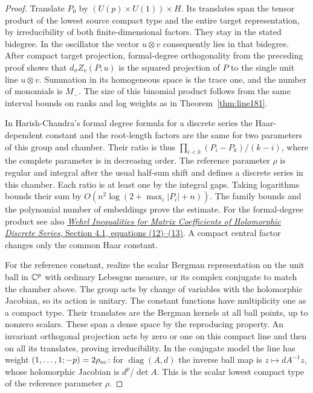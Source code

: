 \documentclass[a4paper,11pt]{article}
\theoremstyle{definition}
\theoremstyle{remark}
\numberwithin{equation}{section}
\begin{document}
\begin{proof}
Translate \(P_0\) by \((U(p)\times U(1))\times H\). Its
translates span the tensor product of the lowest source
compact type and the entire target representation, by
irreducibility of both finite-dimensional factors. They stay
in the stated bidegree. In the oscillator the vector
\(u\otimes v\) consequently lies in that bidegree. After
compact target projection, formal-degree orthogonality from
the preceding proof shows that \(d_\sigma Z_v(P;u)\) is
the squared projection of \(P\) to the single unit line
\(u\otimes v\). Summation in its homogeneous space is the
trace one, and the number of monomials is \(M_-\).
The size of this binomial product follows from the same
interval bounds on ranks and log weights as in
Theorem~\ref{thm:line181}.

In Harish-Chandra's formal degree formula for a discrete series
the Haar-dependent constant and the root-length factors are
the same for two parameters of this group and chamber. Their
ratio is thus \(\prod_{i<k}(P_i-P_k)/(k-i)\), where the
complete parameter is in decreasing order. The reference
parameter \(\rho\) is regular and integral after the usual
half-sum shift and defines a discrete series in this chamber.
Each ratio is at least one by the integral gaps. Taking
logarithms bounds their sum by
\(O(n^2\log(2+\max_i |P_i|+n))\). The family bounds and
the polynomial number of embeddings prove the estimate.
For the formal-degree product see also
\href{https://link.springer.com/article/10.1007/s12220-026-02573-z}{\emph{Wehrl
Inequalities for Matrix Coefficients of Holomorphic Discrete
Series}, Section 4.1, equations (12)--(13)}. A compact central
factor changes only the common Haar constant.

For the reference constant, realize the scalar Bergman
representation on the unit ball in \(\mathbb C^p\) with ordinary
Lebesgue measure, or its complex conjugate to match the
chamber above. The group acts by change of variables with
the holomorphic Jacobian, so its action is unitary. The
constant functions have multiplicity one as a compact
type. Their translates are the Bergman kernels at all ball
points, up to nonzero scalars. These span a dense space by
the reproducing property. An invariant orthogonal projection
acts by zero or one on this compact line and then on all its
translates, proving irreducibility. In the conjugate model
the line has weight \((1,\ldots,1;-p)=2\rho_{\rm nc}\):
for \(\operatorname{diag}(A,d)\) the inverse ball map is
\(z\mapsto d A^{-1}z\), whose holomorphic Jacobian is
\(d^p/\det A\). This is the scalar lowest compact type of
the reference parameter \(\rho\).


\end{proof}
\end{document}
